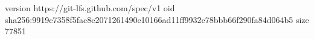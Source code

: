 version https://git-lfs.github.com/spec/v1
oid sha256:9919c7358f5fac8e2071261490e10166ad11ff9932c78bbb66f290fa84d064b5
size 77851

